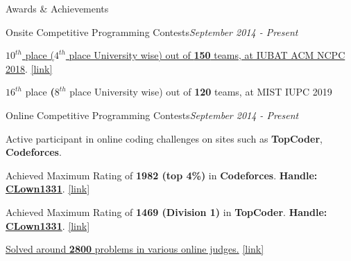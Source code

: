 \documentclass{resume}
\begin{document}
\begin{rSection}{Awards \& Achievements} 

\begin{rSubsection}{Onsite Competitive Programming Contests}{\em September 2014 - Present}{}{}{}
\item \href{https://icpc.baylor.edu/ICPCID/DII3NHEO8O8I}{\textbf{$10^{th}$} place (\textbf{$4^{th}$} place University wise) out of \textbf{150} teams, at IUBAT ACM NCPC 2018}. \href{https://icpc.baylor.edu/ICPCID/DII3NHEO8O8I}{[link]}
\item \textbf{$16^{th}$} place \textbf(\textbf{$8^{th}$} place University wise) out of \textbf{120} teams, at MIST IUPC 2019
\end{rSubsection}

\begin{rSubsection}{Online Competitive Programming Contests}{\em September 2014 - Present}{}{}{}
\item Active participant in online coding challenges on sites such as \textbf{TopCoder}, \textbf{Codeforces}.
\item Achieved Maximum Rating of \textbf{1982 (top 4\%)} in \textbf{Codeforces}. \textbf{Handle:} \textbf{\href{http://codeforces.com/profile/CLown1331}{CLown1331}}. \href{http://codeforces.com/profile/CLown1331}{[link]}
\item Achieved Maximum Rating of \textbf{1469 (Division 1)} in \textbf{TopCoder}. \textbf{Handle:} \textbf{\href{https://www.topcoder.com/members/CLown1331/}{CLown1331}}. \href{https://www.topcoder.com/members/CLown1331/}{[link]}
\item \href{https://www.stopstalk.com/user/profile/clown1331}{Solved around \textbf{2800} problems in various online judges.} \href{https://www.stopstalk.com/user/profile/clown1331}{[link]}
\end{rSubsection}

\end{rSection}

\end{document}
